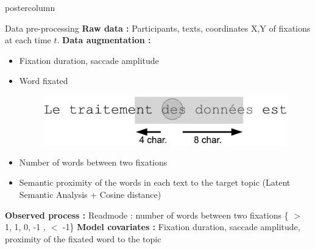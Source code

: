 \documentclass[final,hyperref={pdfpagelabels=false}]{beamer}
\begin{document}
\begin{frame}
\begin{columns}
\begin{column}{.50\textwidth}
\begin{beamercolorbox}[center,wd=\textwidth]{postercolumn}
\begin{minipage}[T]{.98\textwidth}
{            \vfill
            \begin{block}{Data pre-processing}
                \textbf{Raw data :} Participants, texts, coordinates X,Y of fixations at each time $t$.
                \vskip0.5cm
                \textbf{Data augmentation :}
                \begin{itemize}
                    \item[\bullet] Fixation duration, saccade amplitude
                    \item[\bullet]
                    \begin{minipage}{0.45\textwidth}
                        Word fixated
                    \end{minipage}
                    \begin{minipage}{0.35\textwidth}
                        \begin{figure}[H]
                            \includegraphics[width=1\linewidth]{fixation_window.jpg}
                        \end{figure}
                    \end{minipage}
                    \item[\bullet] Number of words between two fixations
                    \item[\bullet] Semantic proximity of the words in each text to the target topic (Latent Semantic Analysis + Cosine distance)
                \end{itemize}
                \vskip0.5cm
                \textbf{Observed process :} Readmode :  number of words between two fixations \{ $>$ 1, 1, 0, -1 , $<$ -1\}
                \vskip0.5cm
                \textbf{Model covariates :} Fixation duration, saccade amplitude, proximity of the fixated word to the topic


\end{block}}
\end{minipage}
\end{beamercolorbox}
\end{column}
\end{columns}
\end{frame}
\end{document}
